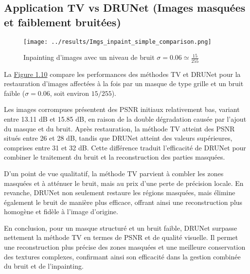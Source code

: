 \documentclass[a4paper, 12pt]{report} %
\begin{document}
\subsection{Application TV vs DRUNet (Images masquées et faiblement bruitées)}


\begin{figure}[H]
\centering
\begin{adjustbox}{width=0.985\linewidth, totalheight=0.47 \textheight, angle=0, scale= 0.9, minipage= 4.2\linewidth, margin= 0}
    \texttt{[image: ../results/Imgs\_inpaint\_simple\_comparison.png]}
\end{adjustbox}
    \caption{Inpainting d'images avec un niveau de bruit $\sigma = 0.06 \simeq \frac{15}{255}$}
    \label{fig:10}
\end{figure}

La \hyperref[fig:10]{Figure 1.10} compare les performances des méthodes TV et DRUNet pour la restauration d’images affectées à la fois par un masque de type grille et un bruit faible ($\sigma = 0.06$, soit environ $15/255$).

Les images corrompues présentent des PSNR initiaux relativement bas, variant entre 13.11 dB et 15.85 dB, en raison de la double dégradation causée par l’ajout du masque et du bruit. Après restauration, la méthode TV atteint des PSNR situés entre 26 et 28 dB, tandis que DRUNet atteint des valeurs supérieures, comprises entre 31 et 32 dB. Cette différence traduit l’efficacité de DRUNet pour combiner le traitement du bruit et la reconstruction des parties masquées.

D’un point de vue qualitatif, la méthode TV parvient à combler les zones masquées et à atténuer le bruit, mais au prix d’une perte de précision locale. En revanche, DRUNet non seulement restaure les régions masquées, mais élimine également le bruit de manière plus efficace, offrant ainsi une reconstruction plus homogène et fidèle à l’image d’origine.

En conclusion, pour un masque structuré et un bruit faible, DRUNet surpasse nettement la méthode TV en termes de PSNR et de qualité visuelle. Il permet une reconstruction plus précise des zones masquées et une meilleure conservation des textures complexes, confirmant ainsi son efficacité dans la gestion combinée du bruit et de l’inpainting.
\end{document}
